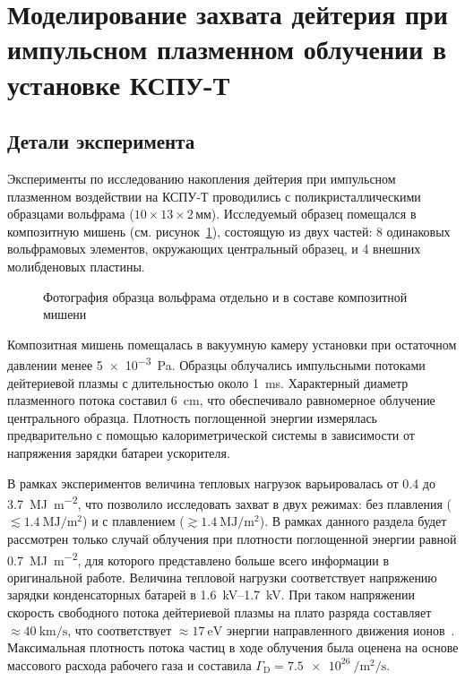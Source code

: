 
\section{Моделирование захвата дейтерия при импульсном плазменном облучении в установке КСПУ-Т}\label{sec:ch3/sec1}
\subsection{Детали эксперимента}\label{sec:ch3/sec1/subsec1}
Эксперименты по исследованию накопления дейтерия при импульсном плазменном воздействии на КСПУ-Т проводились с поликристаллическими образцами вольфрама ($10\times13\times2$\,мм). Исследуемый образец помещался в композитную мишень (см. рисунок~\cref{fig:ch3/QSPA_target}), состоящую из двух частей: 8 одинаковых вольфрамовых элементов, окружающих центральный образец, и 4 внешних молибденовых пластины.
\begin{figure}[ht]
	\caption{Фотография образца вольфрама отдельно и в составе композитной мишени~\cite{Poskakalov2020}}\label{fig:ch3/QSPA_target}
\end{figure}
Композитная мишень помещалась в вакуумную камеру установки при остаточном давлении менее \SI{5e-3}{\pascal}. Образцы облучались импульсными потоками дейтериевой плазмы с длительностью около \SI{1}{\milli\second}. Характерный диаметр плазменного потока составил \SI{6}{\centi\meter}, что обеспечивало равномерное облучение центрального образца. Плотность поглощенной энергии измерялась предварительно с помощью калориметрической системы в зависимости от напряжения зарядки батареи ускорителя. 

В рамках экспериментов величина тепловых нагрузок варьировалась от \num{0.4} до \SI{3.7}{\mega\joule\per\meter\squared}, что позволило исследовать захват в двух режимах: без плавления (\( \lesssim \SI{1.4}{\mega\joule\per\meter\squared} \)) и с плавлением (\( \gtrsim \SI{1.4}{\mega\joule\per\meter\squared} \)). В рамках данного раздела будет рассмотрен только случай облучения при плотности поглощенной энергии равной \SI{0.7}{\mega\joule\per\meter\squared}, для которого представлено больше всего информации в оригинальной работе. Величина тепловой нагрузки соответствует напряжению зарядки конденсаторных батарей в \SIrange{1.6}{1.7}{\kilo\volt}. При таком напряжении скорость свободного потока дейтериевой плазмы на плато разряда составляет \(\approx \SI{40}{\kilo\meter\per\second} \), что соответствует \(\approx \SI{17}{\electronvolt} \) энергии направленного движения ионов~\cite{Yaroshevskaya2024}. Максимальная плотность потока частиц в ходе облучения была оценена на основе массового расхода рабочего газа и составила \( \Gamma_\mathrm{D}=\SI{7.5e26}{\per\meter\squared\per\second} \).

